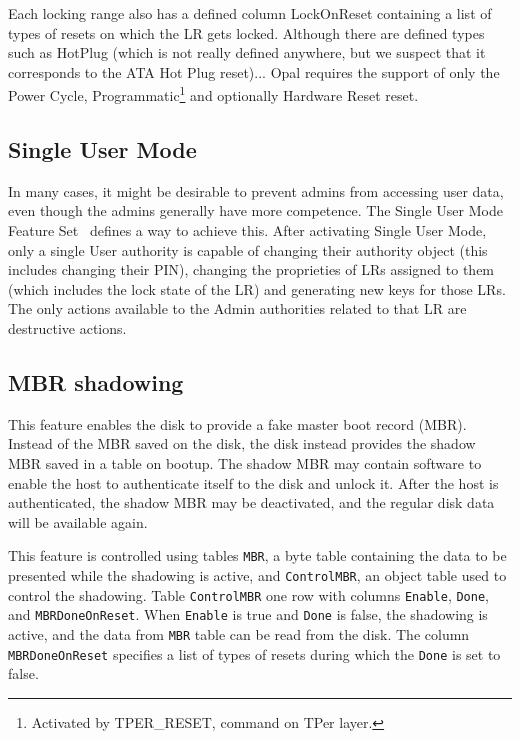 Each locking range also has a defined column LockOnReset containing a list of types of resets on which the LR gets locked. Although there are defined types such as HotPlug (which is not really defined anywhere, but we suspect that it corresponds to the ATA Hot Plug reset)... Opal requires the support of only the Power Cycle, Programmatic\footnote{Activated by TPER\_RESET, command on TPer layer.} and optionally Hardware Reset reset.

\subsection{Single User Mode}

In many cases, it might be desirable to prevent admins from accessing user data, even though the admins generally have more competence. 
The Single User Mode Feature Set~\cite{tcg-sum} defines a way to achieve this.
After activating Single User Mode, only a single User authority is capable of changing their authority object (this includes changing their PIN), changing the proprieties of LRs assigned to them (which includes the lock state of the LR) and generating new keys for those LRs.
The only actions available to the Admin authorities related to that LR are destructive actions.


\subsection{MBR shadowing}

This feature enables the disk to provide a fake master boot record (MBR). Instead of the MBR saved on the disk, the disk instead provides the shadow MBR saved in a table on bootup. The shadow MBR may contain software to enable the host to authenticate itself to the disk and unlock it. After the host is authenticated, the shadow MBR may be deactivated, and the regular disk data will be available again.

This feature is controlled using tables \verb|MBR|, a byte table containing the data to be presented while the shadowing is active, and \verb|ControlMBR|, an object table used to control the shadowing. Table \verb|ControlMBR| one row with columns \verb|Enable|, \verb|Done|, and \verb|MBRDoneOnReset|.
When \verb|Enable| is true and \verb|Done| is false, the shadowing is active, and the data from \verb|MBR| table can be read from the disk. The column \verb|MBRDoneOnReset| specifies a list of types of resets during which the \verb|Done| is set to false.

